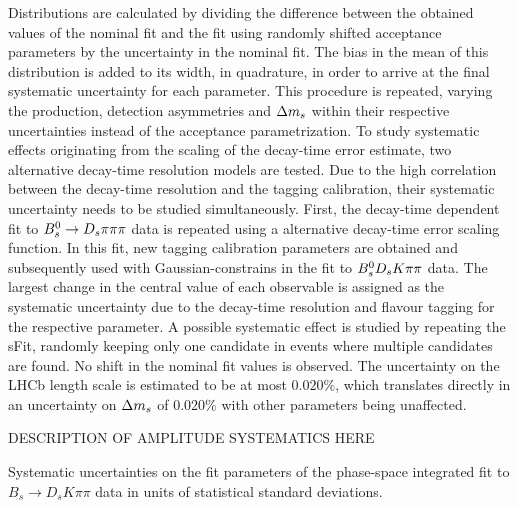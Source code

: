 Distributions are calculated by dividing the difference between the obtained values of the nominal fit and the fit using randomly shifted acceptance parameters by the uncertainty in the nominal fit.
The bias in the mean of this distribution is added to its width, in quadrature, in order to arrive at the final systematic uncertainty for each parameter.\newline
This procedure is repeated, varying the production, detection asymmetries and ${\Delta m_{{s}}}$ within their respective uncertainties instead of the acceptance parametrization.\newline
To study systematic effects originating from the scaling of the decay-time error estimate, two alternative decay-time resolution models are tested.
Due to the high correlation between the decay-time resolution and the tagging calibration, their systematic uncertainty needs to be studied simultaneously.
First, the decay-time dependent fit to ${{B}^0_{s}}\rightarrow{\ensuremath{{D}_{s}}}{\ensuremath{\pi}}{\ensuremath{\pi}}{\ensuremath{\pi}}$ data is repeated using a alternative decay-time error scaling function.
In this fit, new tagging calibration parameters are obtained and subsequently used with Gaussian-constrains in the fit to ${{B}^0_{s}}{{D}_{s}}{K}{\pi}{\pi}$ data.
The largest change in the central value of each \CP observable is assigned as the systematic uncertainty due to the decay-time resolution and flavour tagging for the respective parameter.\newline
A possible systematic effect is studied by repeating the sFit, randomly keeping only one candidate in events where multiple candidates are found. No shift in the nominal fit values is observed.\newline
The uncertainty on the LHCb length scale is estimated to be at most $0.020\%$, which translates directly in an uncertainty on ${\Delta m_{{s}}}$ of $0.020\%$ with other parameters being unaffected.\newline

DESCRIPTION OF AMPLITUDE SYSTEMATICS HERE

%        

\begin{table}[h]
\centering
\caption{Systematic uncertainties on the fit parameters of the phase-space integrated fit to $B_s \to D_s K\pi \pi$ data in units of statistical standard deviations.}
\resizebox{\linewidth}{!}{
        \renewcommand{\arraystretch}{1.5}
        
}
\label{tab:sigSys}
\end{table}


